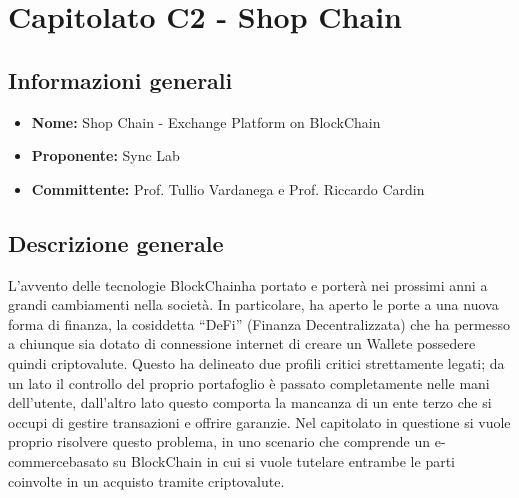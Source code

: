 \section{Capitolato C2 - Shop Chain}\label{section:c2}

\subsection{Informazioni generali}
\begin{itemize}
	\item \textbf{Nome:} Shop Chain - Exchange Platform on	BlockChain
	\item \textbf{Proponente:} Sync Lab
	\item \textbf{Committente:} Prof. Tullio Vardanega e Prof. Riccardo Cardin
\end{itemize}

\subsection{Descrizione generale}
L'avvento delle tecnologie BlockChain\glo ha portato e porterà nei prossimi anni a grandi cambiamenti nella società. 
In particolare, ha aperto le porte a una nuova forma di finanza, la cosiddetta “DeFi” (Finanza Decentralizzata) che ha permesso a chiunque sia dotato di connessione internet di creare un Wallet\glo e possedere quindi criptovalute\glo.
Questo ha delineato due profili critici strettamente legati; da un lato il controllo del proprio portafoglio è passato completamente nelle mani dell'utente, dall'altro lato questo comporta la mancanza di un ente terzo che si occupi di gestire transazioni e offrire garanzie.
\newline
Nel capitolato in questione si vuole proprio risolvere questo problema, in uno scenario che comprende un e-commerce\glo basato su BlockChain in cui si vuole tutelare entrambe le parti coinvolte in un acquisto tramite criptovalute.

